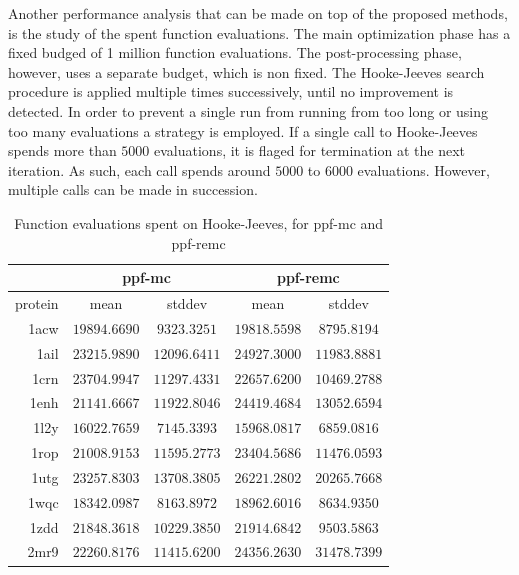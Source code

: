 Another performance analysis that can be made on top of the proposed methods,
is the study of the spent function evaluations. The main optimization phase has
a fixed budged of 1 million function evaluations. The post-processing phase,
however, uses a separate budget, which is non fixed. The Hooke-Jeeves
search procedure is applied multiple times successively, until no improvement
is detected. In order to prevent a single run from running from too long or
using too many evaluations a strategy is employed. If a single call to
Hooke-Jeeves spends more than $5000$ evaluations, it is flaged for termination
at the next iteration. As such, each call spends around $5000$ to $6000$
evaluations. However, multiple calls can be made in succession.

\begin{table}
  \centering
  \begin{tabular}{r|c|c||c|c}
            & \multicolumn{2}{c}{ppf-mc} & \multicolumn{2}{||c}{ppf-remc} \\ \hline
    protein & mean         & stddev       & mean         & stddev \\ \hline \hline
    1acw    & $19894.6690$ & $9323.3251$  & $19818.5598$ & $8795.8194$  \\ \hline
    1ail    & $23215.9890$ & $12096.6411$ & $24927.3000$ & $11983.8881$ \\ \hline
    1crn    & $23704.9947$ & $11297.4331$ & $22657.6200$ & $10469.2788$ \\ \hline
    1enh    & $21141.6667$ & $11922.8046$ & $24419.4684$ & $13052.6594$ \\ \hline
    1l2y    & $16022.7659$ & $7145.3393$  & $15968.0817$ & $6859.0816$  \\ \hline
    1rop    & $21008.9153$ & $11595.2773$ & $23404.5686$ & $11476.0593$ \\ \hline
    1utg    & $23257.8303$ & $13708.3805$ & $26221.2802$ & $20265.7668$ \\ \hline
    1wqc    & $18342.0987$ & $8163.8972$  & $18962.6016$ & $8634.9350$  \\ \hline
    1zdd    & $21848.3618$ & $10229.3850$ & $21914.6842$ & $9503.5863$  \\ \hline
    2mr9    & $22260.8176$ & $11415.6200$ & $24356.2630$ & $31478.7399$ \\ \hline
  \end{tabular}
  \caption{Function evaluations spent on Hooke-Jeeves, for ppf-mc and ppf-remc}
  \label{tab:spent-evals}
\end{table}

